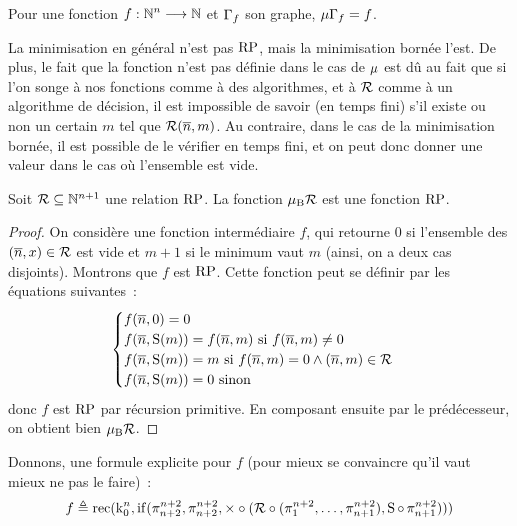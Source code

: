 \begin{remark}
  Pour une fonction $f : \displaystyle \mathbb N^n \longrightarrow \mathbb N$ et $\Gamma_{f}$ son graphe,
  $\mathbin{\mu} \Gamma_{f} = f$.
\end{remark}

La minimisation en général n'est pas $\operatorname{RP}$, mais la minimisation bornée l'est.
De plus, le fait que la fonction n'est pas définie dans le cas de $\mathbin{\mu}$ est dû
au fait que si l'on songe à nos fonctions comme à des algorithmes, et à $\mathrel{\mathcal{R}}$
comme à un algorithme de décision, il est impossible de savoir (en temps fini)
s'il existe ou non un certain $m$ tel que $\mathord{\mathrel{\mathcal{R}}}(\overline{n},m)$. Au
contraire, dans le cas de la minimisation bornée, il est possible de le vérifier
en temps fini, et on peut donc donner une valeur dans le cas où l'ensemble est
vide.

\begin{proposition}
  Soit $\mathord{\mathrel{\mathcal{R}}}\subseteq \mathbb N^{n+1}$ une relation $\operatorname{RP}$. La fonction
  $\mathbin{\mu_{\mathrm{B}}} \mathord{\mathrel{\mathcal{R}}}$ est une fonction $\operatorname{RP}$.
\end{proposition}

\begin{proof}
  On considère une fonction intermédiaire $f$, qui retourne $0$ si l'ensemble
  des $(\overline{n},x)\in\mathord{\mathrel{\mathcal{R}}}$ est vide et $m + 1$ si le minimum vaut
  $m$ (ainsi, on a deux cas disjoints). Montrons que $f$ est $\operatorname{RP}$.
  Cette fonction peut se définir par les équations suivantes~:
  \[\begin{cases}
  f(\overline{n},0) = 0\\
  f(\overline{n},\operatorname{S}(m)) = f(\overline{n},m)\text{ si } f(\overline{n},m) \neq 0\\
  f(\overline{n},\operatorname{S}(m)) = m \text{ si }
  f(\overline{n},m) = 0 \land (\overline{n},m) \in \mathord{\mathrel{\mathcal{R}}}\\
  f(\overline{n},\operatorname{S}(m)) = 0 \text{ sinon }
  \end{cases}\]
  donc $f$ est $\operatorname{RP}$ par récursion primitive. En composant ensuite par le
  prédécesseur, on obtient bien $\mathbin{\mu_{\mathrm{B}}}\mathord{\mathrel{\mathcal{R}}}$.
\end{proof}

\begin{remark}
  Donnons, une formule explicite pour $f$ (pour mieux se convaincre qu'il vaut
  mieux ne pas le faire)~:
  \[f \triangleq \operatorname{rec}(\operatorname{k}_{0}^{n},\operatorname{if}(\mathop{\pi_{n+2}^{n+2}},\mathop{\pi_{n+2}^{n+2}},
  \mathord{\times}\circ(\mathord{\mathrel{\mathcal{R}}}\circ
  (\mathop{\pi_{1}^{n+2}},\ldots,\mathop{\pi_{n+1}^{n+2}}),\operatorname{S}\circ \mathop{\pi_{n+1}^{n+2}})))\]
\end{remark}

